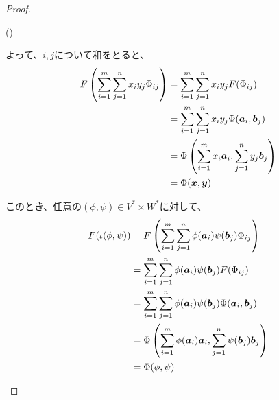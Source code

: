 \documentclass[../../../topic_linear-algebra]{subfiles}
\begin{document}
\begin{proof}
\begin{subpattern}{()}
    \br
    
    よって、$i, j$について和をとると、
    \begin{align*}
      F\left(\sum_{i=1}^m \sum_{j=1}^n x_i y_j \Phi_{ij}\right) &= \sum_{i=1}^m \sum_{j=1}^n x_i y_j F(\Phi_{ij}) \\
      &= \sum_{i=1}^m \sum_{j=1}^n x_i y_j \Phi(\vb*{a}_i, \vb*{b}_j) \\
      &= \Phi\left(\sum_{i=1}^m x_i \vb*{a}_i, \sum_{j=1}^n y_j \vb*{b}_j\right) \\
      &= \Phi(\vb*{x}, \vb*{y})
    \end{align*}
    
    
    \br
    
    このとき、任意の$(\phi, \psi) \in V^* \times W^*$に対して、
    \begin{align*}
      F(\iota(\phi, \psi)) &= F\left(\sum_{i=1}^m \sum_{j=1}^n \phi(\vb*{a}_i) \psi(\vb*{b}_j) \Phi_{ij}\right) \\
      &= \sum_{i=1}^m \sum_{j=1}^n \phi(\vb*{a}_i) \psi(\vb*{b}_j) F(\Phi_{ij}) \\
      &= \sum_{i=1}^m \sum_{j=1}^n \phi(\vb*{a}_i) \psi(\vb*{b}_j) \Phi(\vb*{a}_i, \vb*{b}_j) \\
      &= \Phi\left(\sum_{i=1}^m \phi(\vb*{a}_i) \vb*{a}_i, \sum_{j=1}^n \psi(\vb*{b}_j) \vb*{b}_j\right) \\
      &= \Phi(\phi, \psi)
    \end{align*}
  \end{subpattern}
\end{proof}
\end{document}
